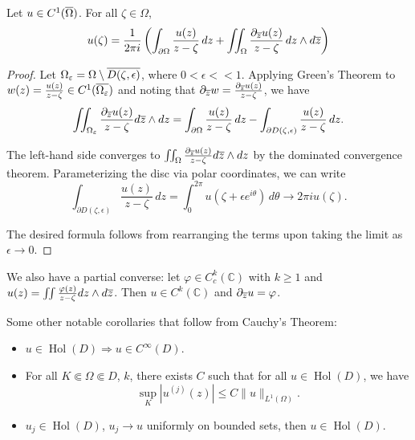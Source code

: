 \documentclass[11pt]{scrartcl}
\newcommand{\C}{\mathbb C}
\newcommand{\Hol}{\operatorname{Hol}}
\let \phi \varphi
\let \p \partial
\let \eps \varepsilon
\newcommand{\1}{\textbf{1}} %
\begin{document}
\begin{theorem} Let $u \in C^1(\overline{\Omega})$.  For all $\zeta \in \Omega$, 
$$u(\zeta) = \frac{1}{2\pi i} \left (\int_{\partial \Omega} \frac{u(z)}{z - \zeta}\,dz + \iint_{\Omega} \frac{\partial_{\overline{z}} u(z)}{z - \zeta}\, dz \wedge d\overline{z} \right)$$
\end{theorem}
\begin{proof}
Let $\Omega_{\eps} = \Omega \setminus \ol{D(\zeta, \epsilon)}$, where $0 < \epsilon << 1$.  Applying Green's Theorem to $w(z) = \frac{u(z)}{z - \zeta} \in C^1(\ol{\Omega_\eps})$ and noting that $\p_{\ol{z}} w = \frac{\p_{\ol{z}} u(z)}{z - \zeta}$, we have 
$$\iint_{\Omega_{\eps}} \frac{\p_{\ol{z}} u(z)}{z - \zeta} d\ol{z} \wedge dz = \int_{\p \Omega} \frac{u(z)}{z - \zeta} \,dz - \int_{\p D(\zeta, \epsilon)} \frac{u(z)}{z - \zeta} \,dz.$$

The left-hand side converges to $\iint_\Omega \frac{\partial_{\overline{z}} u(z)}{z - \zeta} d\overline{z} \wedge dz$ by the dominated convergence theorem.  Parameterizing the disc via polar coordinates, we can write 
$$\int_{\p D(\zeta, \epsilon)} \frac{u(z)}{z - \zeta} \,dz = \int_0^{2\pi} u(\zeta + \epsilon e^{i\theta})\,d\theta \to 2\pi i u(\zeta).$$

The desired formula follows from rearranging the terms upon taking the limit as $\epsilon \to 0$.
\end{proof}
\begin{remark} We also have a partial converse: let $\phi \in C_c^k(\C)$ with $k \ge 1$ and $u(z) = \iint \frac{\phi(z)}{z - \zeta} dz \wedge d\ol{z}$.  Then $u \in C^k(\C)$ and $\p_{\ol{z}} u = \phi$.
\end{remark}
Some other notable corollaries that follow from Cauchy's Theorem:
\begin{itemize}
\item $u \in \Hol(D) \Rightarrow u \in C^\infty(D)$.
\item For all $K \Subset \Omega \Subset D$, $k$, there exists $C$ such that for all $u \in \Hol(D)$, we have 
$$\sup_{K} |u^{(j)}(z)| \le C \|u \|_{L^1(\Omega)}.$$
\item $u_j \in \Hol(D)$, $u_j \to u$ uniformly on bounded sets, then $u \in \Hol(D)$.
\end{itemize}
\end{document}
